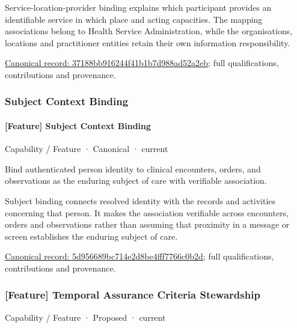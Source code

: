 Service-location-provider binding explains which participant provides an identifiable service in which place and acting capacities. The mapping associations belong to Health Service Administration, while the organisations, locations and practitioner entities retain their own information responsibility.


{\footnotesize \href{../../../../continuum/strategy/capability/feature/37188bb916244f41b1b7d988ad52a2eb.md}{Canonical record: 37188bb916244f41b1b7d988ad52a2eb}; full qualifications, contributions and provenance.}\par
\subsubsection{Subject Context Binding}

\paragraph{[Feature] Subject Context Binding}

\label{element:5d956689bc714e2d8be4fff7766c0b2d}
{\small Capability / Feature · Canonical · current}\par

Bind authenticated person identity to clinical encounters, orders, and observations as the enduring subject of care with verifiable association.



Subject binding connects resolved identity with the records and activities concerning that person. It makes the association verifiable across encounters, orders and observations rather than assuming that proximity in a message or screen establishes the enduring subject of care.


{\footnotesize \href{../../../../continuum/strategy/capability/feature/5d956689bc714e2d8be4fff7766c0b2d.md}{Canonical record: 5d956689bc714e2d8be4fff7766c0b2d}; full qualifications, contributions and provenance.}\par
\subsubsection{[Feature] Temporal Assurance Criteria Stewardship}

\label{element:e345a4b1eef846a7b77568f519e2c75c}
{\small Capability / Feature · Proposed · current}\par

